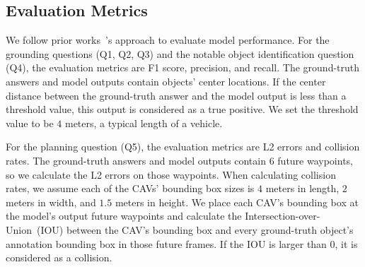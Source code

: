   

\subsection{Evaluation Metrics}
We follow prior works~\cite{tian2024token, wang2024omnidrive}'s approach to evaluate model performance. For the grounding questions (Q1, Q2, Q3) and the notable object identification question (Q4), the evaluation metrics are F1 score, precision, and recall. The ground-truth answers and model outputs contain objects' center locations. If the center distance between the ground-truth answer and the model output is less than a threshold value, this output is considered as a true positive. We set the threshold value to be $4$ meters, a typical length of a vehicle.

For the planning question (Q5), the evaluation metrics are L2 errors and collision rates. The ground-truth answers and model outputs contain $6$ future waypoints, so we calculate the L2 errors on those waypoints. When calculating collision rates, we assume each of the CAVs' bounding box sizes is $4$ meters in length, $2$ meters in width, and $1.5$ meters in height. We place each CAV's bounding box at the model's output future waypoints and calculate the Intersection-over-Union~(IOU) between the CAV's bounding box and every ground-truth object's annotation bounding box in those future frames. If the IOU is larger than $0$, it is considered as a collision.



